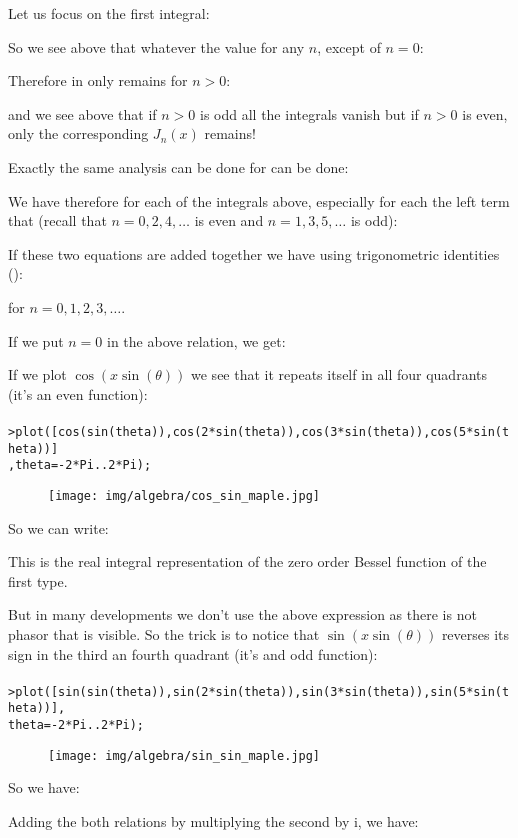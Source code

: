 	Let us focus on the first integral:
	
	So we see above that whatever the value for any $n$, except of $n=0$:
	
	Therefore in only remains for $n>0$:
	
	and we see above that if $n>0$ is odd all the integrals vanish but if $n>0$ is even, only the corresponding $J_n(x)$ remains!
	
	Exactly the same analysis can be done for can be done:
	
	We have therefore for each of the integrals above, especially for each the left term that (recall that $n=0,2,4,\ldots$ is even and $n=1,3,5,\ldots$ is odd):
	
	If these two equations are added together we have using trigonometric identities ():
	
	for $n=0,1,2,3,\ldots$.
	
	If we put $n=0$ in the above relation, we get:
	
	If we plot $\cos(x\sin(\theta))$ we see that it repeats itself in all four quadrants (it's an even function):\\\\
	\texttt{>plot([cos(sin(theta)),cos(2*sin(theta)),cos(3*sin(theta)),cos(5*sin(theta))]\\
	,theta=-2*Pi..2*Pi);}
	\begin{figure}[H]
		\centering
		\texttt{[image: img/algebra/cos\_sin\_maple.jpg]}
	\end{figure}
	So we can write:
	
	This is the real integral representation of the zero order Bessel function of the first type.
	
	But in many developments we don't use the above expression as there is not phasor that is visible. So the trick is to notice that $\sin(x\sin(\theta))$ reverses its sign in the third an fourth quadrant (it's and odd function):\\\\
		\texttt{>plot([sin(sin(theta)),sin(2*sin(theta)),sin(3*sin(theta)),sin(5*sin(theta))],\\
	theta=-2*Pi..2*Pi);}
	\begin{figure}[H]
		\centering
		\texttt{[image: img/algebra/sin\_sin\_maple.jpg]}
	\end{figure}
	So we have:
	
	Adding the both relations by multiplying the second by $\mathrm{i}$,  we have:
	

